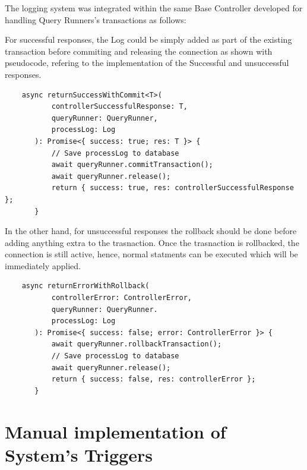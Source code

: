The logging system was integrated within the same Base Controller developed for handling Query Runners's transactions as follows:

For successful responses, the Log could be simply added as part of the existing transaction before commiting and releasing the connection as shown with pseudocode, refering to the implementation of the Successful and unsuccessful responses.

\begin{verbatim}
    async returnSuccessWithCommit<T>(
           controllerSuccessfulResponse: T,
           queryRunner: QueryRunner,
           processLog: Log
       ): Promise<{ success: true; res: T }> {
           // Save processLog to database
           await queryRunner.commitTransaction();
           await queryRunner.release();
           return { success: true, res: controllerSuccessfulResponse };
       }
\end{verbatim}

In the other hand, for unsuccessful responses the rollback should be done before adding anything extra to the trasnaction.  Once the trasnaction is rollbacked, the connection is still active, hence, normal statments can be executed which will be immediately applied.

\begin{verbatim}
    async returnErrorWithRollback(
           controllerError: ControllerError,
           queryRunner: QueryRunner.
           processLog: Log
       ): Promise<{ success: false; error: ControllerError }> {
           await queryRunner.rollbackTransaction();
           // Save processLog to database
           await queryRunner.release();
           return { success: false, res: controllerError };
       }
    \end{verbatim}

\section{Manual implementation of System's Triggers}

